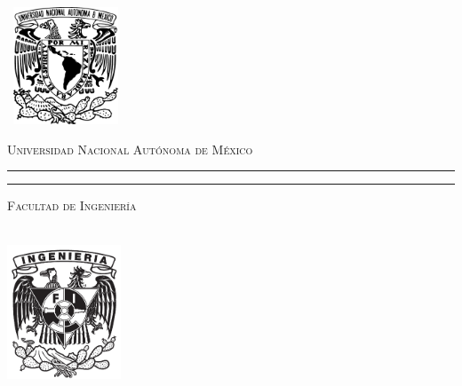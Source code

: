 \documentclass[a4paper,12pt]{article}
\begin{document}
    \begin{titlepage}
        \thispagestyle{empty}
        \begin{minipage}[c][0.17\textheight][c]{0.25\textwidth}
            \begin{center}
                \includegraphics[width=3.5cm, height=3.5cm]{media/Escudo-UNAM.pdf}
            \end{center}
        \end{minipage}
        \begin{minipage}[c][0.195\textheight][t]{0.75\textwidth}
            \begin{center}
                \vspace{0.3cm}
                \textsc{\large Universidad Nacional Aut\'onoma de M\'exico}\\[0.5cm]
                \vspace{0.3cm}
                \hrule height2.5pt
                \vspace{.2cm}
                \hrule height1pt
                \vspace{.8cm}
                \textsc{Facultad de Ingenier\'ia}\\[0.5cm] %
            \end{center}
        \end{minipage}

        \begin{minipage}[c][0.81\textheight][t]{0.25\textwidth}
            \vspace*{5mm}
            \begin{center}
                \hskip2.0mm
                \vrule width1pt height13cm 
                \vspace{5mm}
                \hskip2pt
                \vrule width2.5pt height13cm
                \hskip2mm
                \vrule width1pt height13cm \\
                \vspace{5mm}
                \includegraphics[height=4.0cm]{media/ESCUDO-FI_negro.jpg}
            \end{center}
        \end{minipage}
        \begin{minipage}[c][0.81\textheight][t]{0.75\textwidth}
            \begin{center}
                \vspace{1cm}


\end{center}
\end{minipage}
\end{titlepage}
\end{document}
